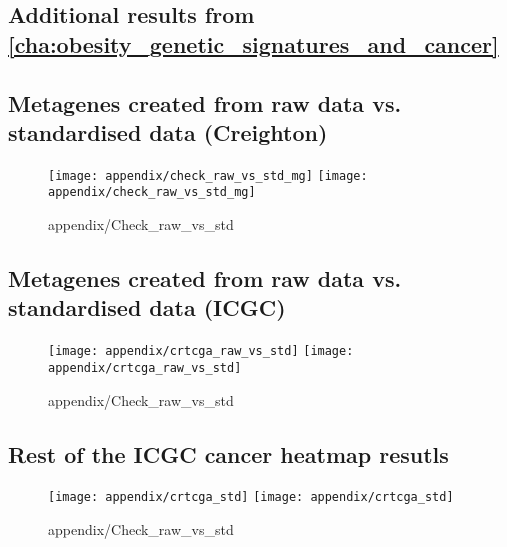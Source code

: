 \begin{appendices}
	\renewcommand{\thesection}{\Alph{chapter}\arabic{section}}

	\chapter{Additional results from \cref{cha:obesity_genetic_signatures_and_cancer}}
	\label{app:a}

	\section{Metagenes created from raw data vs. standardised data (Creighton)}
	\label{sec:metagenes_created_from_raw_data_vs_standardised_data}
	
	\begin{figure}[htpb]
		\centering
		\texttt{[image: appendix/check\_raw\_vs\_std\_mg]}
		\hfill
		\texttt{[image: appendix/check\_raw\_vs\_std\_mg]}
		\caption{appendix/Check_raw_vs_std}
		\label{fig:appendix/check_raw_vs_std}
	\end{figure}
	
	\section{Metagenes created from raw data vs. standardised data (ICGC)}
	\label{sec:metagenes_created_from_raw_data_vs_standardised_data_icgc}

	\begin{figure}[htpb]
		\centering
		\texttt{[image: appendix/crtcga\_raw\_vs\_std]}
		\hfill
		\texttt{[image: appendix/crtcga\_raw\_vs\_std]}
		\caption{appendix/Check_raw_vs_std}
		\label{fig:appendix/check_raw_vs_std}
	\end{figure}

	\section{Rest of the ICGC cancer heatmap resutls}
	\label{sec:rest_of_the_icgc_cancer_heatmap_resutls}
	
	\begin{figure}[htpb]
		\centering
		\texttt{[image: appendix/crtcga\_std]}
		\hfill
		\texttt{[image: appendix/crtcga\_std]}
		\caption{appendix/Check_raw_vs_std}
		\label{fig:appendix/check_raw_vs_std}
	\end{figure}


\end{appendices}
